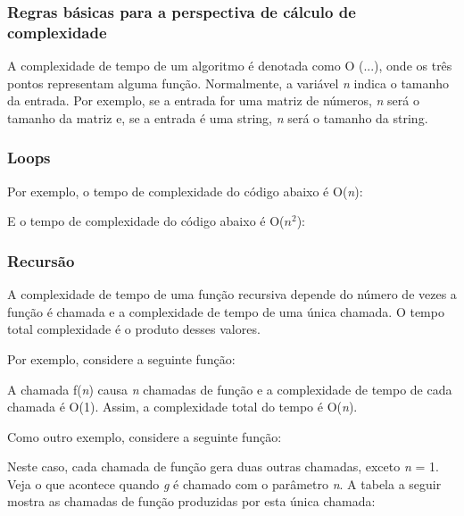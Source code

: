 \subsubsection{Regras básicas para a perspectiva de cálculo de complexidade}

A complexidade de tempo de um algoritmo é denotada como O (...), onde os três pontos representam alguma função. Normalmente, a variável \textit{n} indica o tamanho da entrada. Por exemplo, se a entrada for uma matriz de números, \textit{n} será o tamanho da matriz e, se a entrada é uma string, \textit{n} será o tamanho da string.


\subsubsection*{Loops}

Por exemplo, o tempo de complexidade do código abaixo é O(\textit{n}):



E o tempo de complexidade do código abaixo é O($n^2$):



\subsubsection*{Recursão}

A complexidade de tempo de uma função recursiva depende do número de vezes a função é chamada e a complexidade de tempo de uma única chamada. O tempo total complexidade é o produto desses valores.

Por exemplo, considere a seguinte função:



A chamada f(\textit{n}) causa \textit{n} chamadas de função e a complexidade de tempo de cada chamada é O(1). Assim, a complexidade total do tempo é O(\textit{n}).

Como outro exemplo, considere a seguinte função:



Neste caso, cada chamada de função gera duas outras chamadas, exceto \textit{n} = 1. Veja o que acontece quando \textit{g} é chamado com o parâmetro \textit{n}. A tabela a seguir mostra as chamadas de função produzidas por esta única chamada:


